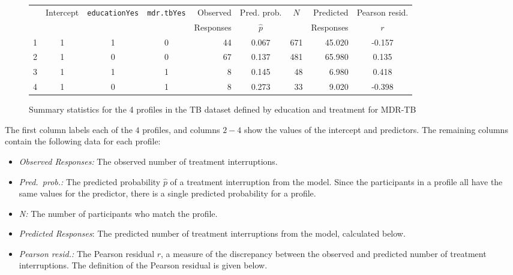 \begin{figure}[ht]
\centering
\begin{tabular}{rrrrrrrrr}
  \hline
 & Intercept & \texttt{educationYes} & \texttt{mdr.tbYes} & Observed & Pred. prob.  &
 \multicolumn{1}{c}{$N$} & Predicted & Pearson resid. \\
 & & & & Responses & \multicolumn{1}{c}{$\hat{p}$} & & Responses & \multicolumn{1}{c}{$r$} \\
  \hline
1 & \multicolumn{1}{c}{1} & \multicolumn{1}{c}{1} & \multicolumn{1}{c}{0} &
 44 & \multicolumn{1}{c}{0.067} & 671 & 45.020 & \multicolumn{1}{c}{-0.157} \\
  2 & \multicolumn{1}{c}{1} & \multicolumn{1}{c}{0} & \multicolumn{1}{c}{0}
  & 67 & \multicolumn{1}{c}{0.137} & 481 & 65.980 & \multicolumn{1}{c}{0.135} \\
  3 & \multicolumn{1}{c}{1} & \multicolumn{1}{c}{1} & \multicolumn{1}{c}{1}
  & 8 & \multicolumn{1}{c}{0.145} & 48 & 6.980 & \multicolumn{1}{c}{0.418} \\
  4 & \multicolumn{1}{c}{1} & \multicolumn{1}{c}{0} & \multicolumn{1}{c}{1}
  & 8 & \multicolumn{1}{c}{0.273} & 33 & 9.020 & \multicolumn{1}{c}{-0.398} \\
   \hline
\end{tabular}
\caption{Summary statistics for the 4 profiles in the TB dataset
       defined by education and treatment for MDR-TB}
\label{figure:tbInterruptProfiles}
\end{figure}

The first column labels each of the $4$ profiles, and columns $2-4$ show the values of the intercept and predictors.  The remaining columns contain the following data for each profile:
\begin{itemize}

\item \textit{Observed Responses:} The observed number of treatment interruptions.

\item \textit{Pred.\ prob.:}  The predicted probability $\hat{p}$ of a treatment interruption from the model.  Since the participants in a profile all have the same values for the predictor, there is a single predicted probability for a profile.

\item \textit{N:} The number of participants who match the profile.

\item \textit{Predicted Responses}: The predicted number of treatment interruptions from the model, calculated below.

\item \textit{Pearson resid.:}  The Pearson residual $r$, a measure of the discrepancy between the observed and predicted number of treatment interruptions.  The definition of the Pearson residual is given below.

\end{itemize}

